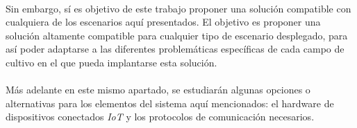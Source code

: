 \documentclass[../../memoria.tex]{subfiles}
\begin{document}
\paragraph{}
Sin embargo, sí es objetivo de este trabajo proponer una solución compatible con cualquiera de los escenarios aquí presentados. El objetivo es proponer una solución altamente compatible para cualquier tipo de escenario desplegado, para así poder adaptarse a las diferentes problemáticas específicas de cada campo de cultivo en el que pueda implantarse esta solución.

\paragraph{}
Más adelante en este mismo apartado, se estudiarán algunas opciones o alternativas para los elementos del sistema aquí mencionados: el hardware de dispositivos conectados \textit{IoT} y los protocolos de comunicación necesarios.
\end{document}
